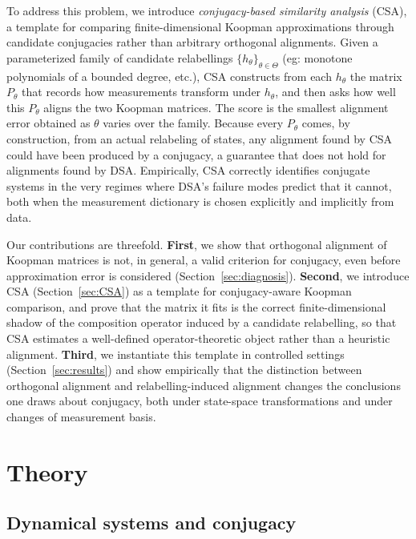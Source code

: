 \documentclass{article}
\theoremstyle{definition}
\begin{document}
To address this problem, we introduce \emph{conjugacy-based similarity analysis} (CSA), a template for comparing finite-dimensional Koopman approximations through candidate conjugacies rather than arbitrary orthogonal alignments. Given a parameterized family of candidate relabellings $\{h_\theta\}_{\theta \in \Theta}$ (eg: monotone  polynomials of a bounded degree, etc.), CSA constructs from each $h_\theta$ the matrix $P_\theta$ that records how measurements transform under $h_\theta$, and then asks how well this $P_\theta$ aligns the two Koopman matrices. The score is the smallest alignment error obtained as $\theta$ varies over the family. Because every $P_\theta$ comes, by construction, from an actual relabeling of states, any alignment found by CSA could have been produced by a conjugacy, a guarantee that does not hold for alignments found by DSA. Empirically, CSA correctly identifies conjugate systems in the very regimes where DSA's failure modes predict that it cannot, both when the measurement dictionary is chosen explicitly and implicitly from data.

Our contributions are threefold. \textbf{First}, we show that orthogonal alignment of Koopman matrices is not, in general, a valid criterion for conjugacy, even before approximation error is considered (Section~\ref{sec:diagnosis}). \textbf{Second}, we introduce CSA (Section~\ref{sec:CSA}) as a template for conjugacy-aware Koopman comparison, and prove that the matrix it fits is the correct finite-dimensional shadow of the composition operator induced by a candidate relabelling, so that CSA estimates a well-defined operator-theoretic object rather than a heuristic alignment. \textbf{Third}, we instantiate this template in controlled settings (Section~\ref{sec:results}) and show empirically that the distinction between orthogonal alignment and relabelling-induced alignment changes the conclusions one draws about conjugacy, both under state-space transformations and under changes of measurement basis.



\section{Theory}
\label{sec:background}


\subsection{Dynamical systems and conjugacy}
\label{sec:bg-conjugacy}
\end{document}
